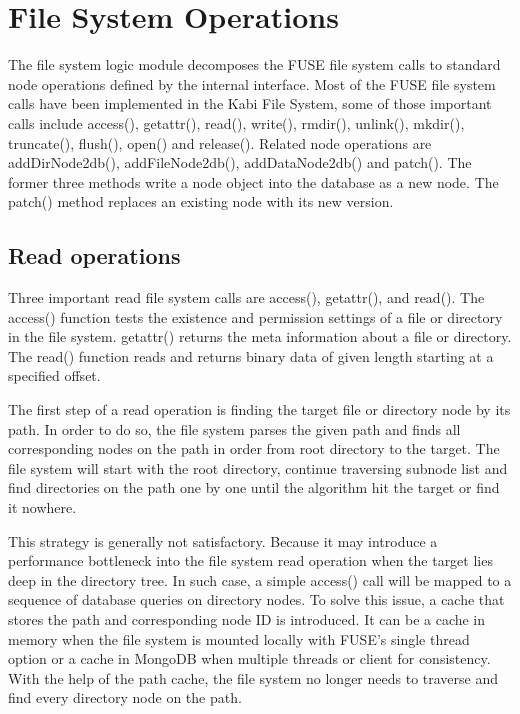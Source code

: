 \section{File System Operations}

    The file system logic module decomposes the FUSE file system calls to standard node operations defined by the internal interface. Most of the FUSE file system calls have been implemented in the Kabi File System, some of those important calls include access(), getattr(), read(), write(), rmdir(), unlink(), mkdir(), truncate(), flush(), open() and release(). Related node operations are addDirNode2db(), addFileNode2db(), addDataNode2db() and patch(). The former three methods write a node object into the database as a new node. The patch() method replaces an existing node with its new version.

\subsection{Read operations}

    Three important read file system calls are access(), getattr(), and read(). The access() function tests the existence and permission settings of a file or directory in the file system. getattr() returns the meta information about a file or directory. The read() function reads and returns binary data of given length starting at a specified offset.

    The first step of a read operation is finding the target file or directory node by its path. In order to do so, the file system parses the given path and finds all corresponding nodes on the path in order from root directory to the target. The file system will start with the root directory, continue traversing subnode list and find directories on the path one by one until the algorithm hit the target or find it nowhere.

    This strategy is generally not satisfactory. Because it may introduce a performance bottleneck into the file system read operation when the target lies deep in the directory tree. In such case, a simple access() call will be mapped to a sequence of database queries on directory nodes. To solve this issue, a cache that stores the path and corresponding node ID is introduced. It can be a cache in memory when the file system is mounted locally with FUSE's single thread option or a cache in MongoDB when multiple threads or client for consistency. With the help of the path cache, the file system no longer needs to traverse and find every directory node on the path.

